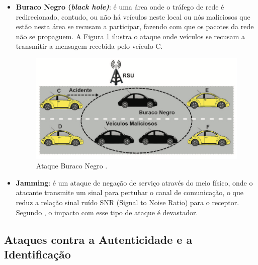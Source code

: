 \documentclass[
	12pt,				%
	oneside,			%
	a4paper,			%
	english,			%
	brazil				%
	]{abntex2ppgsi}
\begin{document}
\begin{itemize}
	\item {\textbf{Buraco Negro (\textit{black hole)}}: é uma área onde o tráfego de rede é redirecionado, contudo, ou não há veículos neste local ou nós maliciosos que estão nesta área se recusam a participar, fazendo com que os pacotes da rede não se propaguem. A Figura \ref{fig:ataguerubronegro} ilustra o ataque onde veículos se recusam a transmitir a mensagem recebida pelo veículo C.}		
	
\begin{figure}[h!]
	\centering
	\includegraphics [width=12cm] {images/ataqueburaconegro.png}
	\caption{Ataque Buraco Negro \cite{wanghamsegurancca}.}
	\label{fig:ataguerubronegro}
\end{figure}
	
	\item {\textbf{Jamming}: é um ataque de negação de serviço através do meio físico, onde o atacante transmite um sinal para pertubar o canal de comunicação, o que reduz a relação sinal ruído SNR (Signal to Noise Ratio) para o receptor. Segundo  , o impacto com esse tipo de ataque é devastador.}			
\end{itemize}

\subsection{Ataques contra a Autenticidade e a Identificação}
\end{document}
